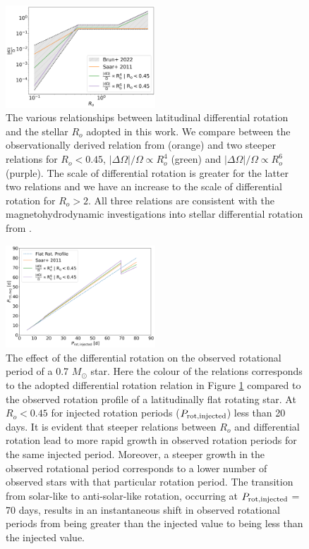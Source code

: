\begin{figure}
\centering
    \includegraphics[width=0.5\textwidth]{Figures/rot_gap_figures/comparison_diffrot.png}
    \caption{
    	The various relationships between latitudinal differential rotation and the stellar $R_o$ adopted in this work. We compare between the observationally derived relation from \citet{saar_2011} (orange) and two steeper relations for $R_o<0.45$, $|\Delta \Omega|/\Omega \propto R_o^4$ (green) and $|\Delta \Omega|/\Omega \propto R_o^6$ (purple). The scale of differential rotation is greater for the latter two relations and we have an increase to the scale of differential rotation for $R_o>2$. All three relations are consistent with the magnetohydrodynamic investigations into stellar differential rotation from \citet{brun_2022}.
}
    \label{fig:compar_diffrot}
\end{figure}

\begin{figure}
\centering
    \includegraphics[width=0.5\textwidth]{Figures/rot_gap_figures/comparison_observed_rot_periods.png}
    \caption{
    	The effect of the differential rotation on the observed rotational period of a 0.7 $M_{\odot}$ star. Here the colour of the relations corresponds to the adopted differential rotation relation in Figure \ref{fig:compar_diffrot} compared to the observed rotation profile of a latitudinally flat rotating star. At $R_o<0.45$ for injected rotation periods ($P_{\rm{rot, injected}}$) less than 20 days. It is evident that steeper relations between $R_o$ and differential rotation lead to more rapid growth in observed rotation periods for the same injected period. Moreover, a steeper growth in the observed rotational period corresponds to a lower number of observed stars with that particular rotation period. The transition from solar-like to anti-solar-like rotation, occurring at $P_{\rm{rot, injected}}$ = 70 days, results in an instantaneous shift in observed rotational periods from being greater than the injected value to being less than the injected value.
}
    \label{fig:comp_per}
\end{figure}

